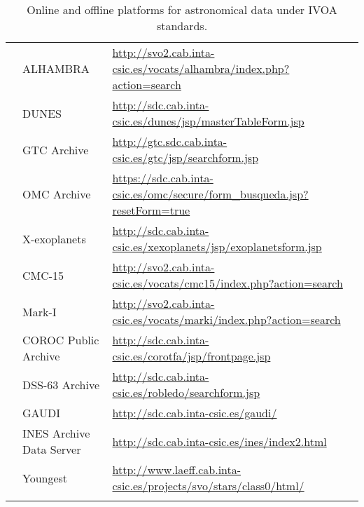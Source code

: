 \begin{longtable}{|m{2cm}|m{4.5cm}|m{7.5cm}|}
    \cline{2-3}
    & ALHAMBRA
    & \url{http://svo2.cab.inta-csic.es/vocats/alhambra/index.php?action=search} \\
    \cline{2-3}
    & DUNES
    & \url{http://sdc.cab.inta-csic.es/dunes/jsp/masterTableForm.jsp} \\
    \cline{2-3}
    & GTC Archive
    & \url{http://gtc.sdc.cab.inta-csic.es/gtc/jsp/searchform.jsp} \\
    \cline{2-3}
    & OMC Archive
    &
    \url{https://sdc.cab.inta-csic.es/omc/secure/form_busqueda.jsp?resetForm=true}
    \\
    \cline{2-3}
    & X-exoplanets
    & \url{http://sdc.cab.inta-csic.es/xexoplanets/jsp/exoplanetsform.jsp} \\
    \cline{2-3}
    & CMC-15
    & \url{http://svo2.cab.inta-csic.es/vocats/cmc15/index.php?action=search} \\
    \cline{2-3}
    & Mark-I
    & \url{http://svo2.cab.inta-csic.es/vocats/marki/index.php?action=search} \\
    \cline{2-3}
    & COROC Public Archive
    & \url{http://sdc.cab.inta-csic.es/corotfa/jsp/frontpage.jsp} \\
    \cline{2-3}
    & DSS-63 Archive
    & \url{http://sdc.cab.inta-csic.es/robledo/searchform.jsp} \\
    \cline{2-3}
    & GAUDI
    & \url{http://sdc.cab.inta-csic.es/gaudi/} \\
    \cline{2-3}
    & INES Archive Data Server
    & \url{http://sdc.cab.inta-csic.es/ines/index2.html} \\
    \cline{2-3}
    & Youngest
    & \url{http://www.laeff.cab.inta-csic.es/projects/svo/stars/class0/html/} \\
    \hline
\caption{Online and offline platforms for astronomical data under IVOA
         standards.}
\label{table:vo_platforms}
\end{longtable}
\twocolumn
\normalsize
